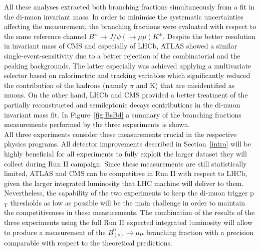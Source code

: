 All these analyses extracted both branching fractions simultaneously from a fit in the di-muon invariant mass. In order to minimise the systematic uncertainties affecting the measurement, the branching fractions were evaluated with respect to the same reference channel $B^{\pm} \to J/\psi(\to \mu \mu) K^{\pm}$. Despite the better resolution in invariant mass of CMS and especially of LHCb, ATLAS showed a similar single-event-sensitivity due to a better rejection of the combinatorial and the peaking backgrounds. The latter especially was achieved applying a  multivariate selector based on calorimetric and tracking variables which significantly reduced the contribution of the hadrons (namely $\pi$ and K) that are misidentified as muons. On the other hand, LHCb and CMS provided a better treatment of the partially reconstructed and semileptonic decays contributions in the di-muon invariant mass fit.
In Figure~\ref{fig:BsBd} a summary of the branching fractions measurements performed by the three experiments is shown.\\
All three experiments consider these measurements crucial in the respective physics programs. All detector improvements described in Section~\ref{intro} will be highly beneficial for all experiments to fully exploit the larger dataset they will collect during Run II campaign. Since these measurements are still statistically limited, ATLAS and CMS can be competitive in Run II with respect to LHCb, given the larger integrated luminosity that LHC machine will deliver to them. Nevertheless, the capability of the two experiments to keep the di-muon trigger p$_\mathrm{T}$ thresholds as low as possible will be the main challenge in order to maintain the competitiveness in these measurements. The combination of the results of the three experiments using the full Run II expected integrated luminosity will allow to produce a measurement of the $B^0_{(s)} \to \mu \mu$  branching fraction with a precision comparable with respect to the theoretical predictions.
